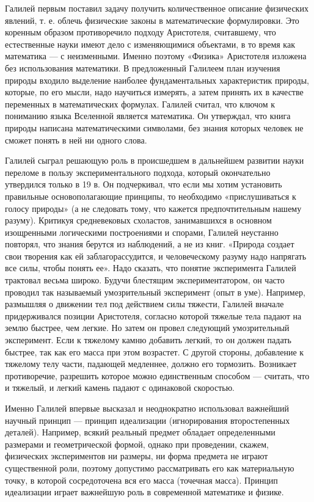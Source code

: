 \documentclass[
]{article}
\begin{document}
Галилей первым поставил задачу получить количественное описание
физических явлений, т. е. облечь физические законы в математические
формулировки. Это коренным образом противоречило подходу Аристотеля,
считавшему, что естественные науки имеют дело с изменяющимися объектами,
в то время как математика --- с неизменными. Именно поэтому «Физика»
Аристотеля изложена без использования математики. В предложенный
Галилеем план изучения природы входило выделение наиболее
фундаментальных характеристик природы, которые, по его мысли, надо
научиться измерять, а затем принять их в качестве переменных в
математических формулах. Галилей считал, что ключом к пониманию языка
Вселенной является математика. Он утверждал, что книга природы написана
математическими символами, без знания которых человек не сможет понять в
ней ни одного слова.

Галилей сыграл решающую роль в происшедшем в дальнейшем развитии науки
переломе в пользу экспериментального подхода, который окончательно
утвердился только в 19 в. Он подчеркивал, что если мы хотим установить
правильные основополагающие принципы, то необходимо «прислушиваться к
голосу природы» (а не следовать тому, что кажется предпочтительным
нашему разуму). Критикуя средневековых схоластов, занимавшихся в
основном изощренными логическими построениями и спорами, Галилей
неустанно повторял, что знания берутся из наблюдений, а не из книг.
«Природа создает свои творения как ей заблагорассудится, и человеческому
разуму надо напрягать все силы, чтобы понять ее». Надо сказать, что
понятие эксперимента Галилей трактовал весьма широко. Будучи блестящим
экспериментатором, он часто проводил так называемый умозрительный
эксперимент (опыт в уме). Например, размышляя о движении тел под
действием силы тяжести, Галилей вначале придерживался позиции
Аристотеля, согласно которой тяжелые тела падают на землю быстрее, чем
легкие. Но затем он провел следующий умозрительный эксперимент. Если к
тяжелому камню добавить легкий, то он должен падать быстрее, так как его
масса при этом возрастет. С другой стороны, добавление к тяжелому телу
части, падающей медленнее, должно его тормозить. Возникает противоречие,
разрешить которое можно единственным способом --- считать, что и
тяжелый, и легкий камень падают с одинаковой скоростью.

Именно Галилей впервые высказал и неоднократно использовал важнейший
научный принцип --- принцип идеализации (игнорирования второстепенных
деталей). Например, всякий реальный предмет обладает определенными
размерами и геометрической формой, однако при проведении, скажем,
физических экспериментов ни размеры, ни форма предмета не играют
существенной роли, поэтому допустимо рассматривать его как материальную
точку, в которой сосредоточена вся его масса (точечная масса). Принцип
идеализации играет важнейшую роль в современной математике и физике.
\end{document}
